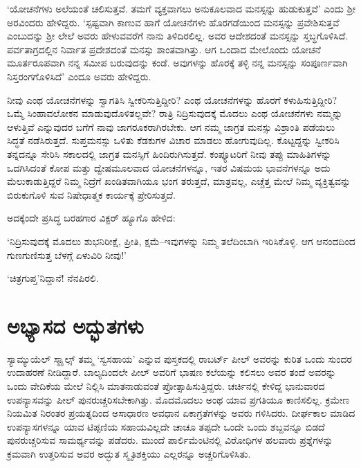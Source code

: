 ‘ಯೋಚನೆಗಳು ಅಲೆಯಂತೆ ಚಲಿಸುತ್ತವೆ. ತಮಗೆ ವ್ಯಕ್ತವಾಗಲು ಅನುಕೂಲವಾದ ಮನಸ್ಸನ್ನು ಹುಡುಕುತ್ತವೆ’ ಎಂದು ಶ‍್ರೀ ಅರವಿಂದರು ಹೇಳಿದ್ದರು. ‘ಸ್ಪಷ್ಟವಾಗಿ ಕಾಣುವ ಹಾಗೆ ಯೋಚನೆಗಳು ಹೊರಗಡೆಯಿಂದ ಮನಸ್ಸನ್ನು ಪ್ರವೇಶಿಸುತ್ತವೆ ಎಂಬುದನ್ನು ಶ‍್ರೀ ಲೇಲೆ ಅವರು ಹೇಳುವವರೆಗೆ ನಾನು ತಿಳಿದಿರಲಿಲ್ಲ. ಅವರ ಆದೇಶದಂತೆ ಮನಸ್ಸನ್ನು ಸ್ತಬ್ಧಗೊಳಿಸಿದೆ. ಪರ್ವತಾಗ್ರದಲ್ಲಿನ ನಿರ್ವಾತ ಪ್ರದೇಶದಂತೆ ಮನಸ್ಸು ಶಾಂತವಾಗಿತ್ತು. ಆಗ ಒಂದಾದ ಮೇಲೊಂದು ಯೋಚನೆ ಮೂರ್ತರೂಪವಾಗಿ ನನ್ನ ಸಮೀಪ ಬರುವುದನ್ನು ಕಂಡೆ. ಅವುಗಳನ್ನು ಹೊರಕ್ಕೆ ತಳ್ಳಿ ನನ್ನ ಮನಸ್ಸನ್ನು ಸಂಪೂರ್ಣವಾಗಿ ನಿಸ್ತರಂಗಗೊಳಿಸಿದೆ’ ಎಂದೂ ಅವರು ಹೇಳಿದ್ದರು.

ನೀವು ಎಂಥ ಯೋಚನೆಗಳನ್ನು ಸ್ವಾಗತಿಸಿ ಸ್ವೀಕರಿಸುತ್ತಿದ್ದೀರಿ? ಎಂಥ ಯೋಚನೆಗಳನ್ನು ಹೊರಗೆ ಕಳುಹಿಸುತ್ತಿದ್ದೀರಿ? ಒಮ್ಮೆ ಸಿಂಹಾವಲೋಕನ ಮಾಡುವುದೊಳಿತಲ್ಲವೇ? ರಾತ್ರಿ ನಿದ್ರಿಸುವುದಕ್ಕೆ ಮೊದಲು ಎಂಥ ಯೋಚನೆಗಳು ನಮ್ಮನ್ನು ಆಳುತ್ತಿವೆ ಎನ್ನುವುದರ ಬಗೆಗೆ ನಾವು ಜಾಗರೂಕರಾಗಿರಬೇಕು. ಆಗ ನಮ್ಮ ಜಾಗ್ರತ ಮನಸ್ಸು ವಿಶ್ರಾಂತಿ ಪಡೆಯಲು ಸಿದ್ಧತೆ ನಡೆಸಿರುತ್ತದೆ. ಸುಪ್ತಮನಸ್ಸು ಒಳಿತು ಕೆಡಕುಗಳ ವಿಚಾರ ಮಾಡಲು ಹೋಗುವುದಿಲ್ಲ. ಕೊಟ್ಟದ್ದನ್ನು ಸ್ವೀಕರಿಸಿ ತನ್ನದನ್ನೂ ಸೇರಿಸಿ ಸಕಾಲದಲ್ಲಿ ಜಾಗ್ರತ ಮನಸ್ಸಿಗೆ ಹಿಂದಿರುಗಿಸುತ್ತದೆ. ಕಂಪ್ಯೂಟರಿಗೆ ನೀವು ತಪ್ಪು ಮಾಹಿತಿಗಳನ್ನು ಒದಗಿಸಿದಂತೆ ಕೋಪ ಮತ್ತು ದ್ವೇಷಮೂಲವಾದ ಯೋಚನೆಗಳನ್ನೂ, ಇತರ ವಿಷಮಯ ಭಾವನೆಗಳನ್ನೂ ಅದು ಮೆಲುಕಾಡುತ್ತಿದ್ದರೆ ನಿಮ್ಮ ನಿದ್ರೆಗೆ ಖಂಡಿತವಾಗಿಯೂ ಭಂಗ ತರುತ್ತದೆ, ಮಾತ್ರವಲ್ಲ, ಎಚ್ಚೆತ್ತ ಮೇಲೆ ನಿಮ್ಮ ವ್ಯಕ್ತಿತ್ವವನ್ನು ಬಿರುಕುಗೊಳಿ ಸುವ ನಿಷೇಧಾತ್ಮಕ ಕಾರ್ಯಕ್ಕೆ ಪ್ರೇರಿಸುತ್ತದೆ.

ಅದಕ್ಕೆಂದೇ ಪ್ರಸಿದ್ಧ ಬರಹಗಾರ ವಿಕ್ಟರ್ ಹ್ಯೂಗೊ ಹೇಳಿದ:

‘ನಿದ್ರಿಸುವುದಕ್ಕೆ ಮೊದಲು ಶುಭನಿರೀಕ್ಷೆ, ಪ್ರೀತಿ, ಕ್ಷಮೆ–ಇವುಗಳನ್ನು ನಿಮ್ಮ ತಲೆದಿಂಬಾಗಿ ಇರಿಸಿಕೊಳ್ಳಿ. ಆಗ ಆನಂದದಿಂದ ಗುಣಗುಣಿಸುತ್ತ ಬೆಳಗ್ಗೆ ಏಳುವಿರಿ ನೀವು!’

‘ಚಿತ್ರಗುಪ್ತ’ನಿದ್ದಾನೆ! ನೆನಪಿರಲಿ.


\section*{ಅಭ್ಯಾಸದ ಅದ್ಭುತಗಳು}


ಸ್ಯಾಮ್ಯುಯೆಲ್ ಸ್ಮಾೖಲ್ಸ್ ತಮ್ಮ ‘ಸ್ವಸಹಾಯ’ ಎನ್ನುವ ಪುಸ್ತಕದಲ್ಲಿ ರಾಬರ್ಟ್ ಪೀಲ್ ಅವರನ್ನು ಕುರಿತ ಒಂದು ಸುಂದರ ಉದಾಹರಣೆ ನೀಡಿದ್ದಾರೆ. ಬಾಲ್ಯದಿಂದಲೇ ಪೀಲ್ ಅವರಿಗೆ ಭಾಷಣ ಕಲೆಯನ್ನು ಕಲಿಸಲು ಅವರ ತಂದೆ ಅವರನ್ನು ಒಂದು ವೇದಿಕೆಯ ಮೇಲೆ ನಿಲ್ಲಿಸಿ ಮಾತನಾಡುವಂತೆ ಪ್ರೋತ್ಸಾಹಿಸುತ್ತಿದ್ದರು. ಚರ್ಚಿನಲ್ಲಿ ಕೇಳಿದ್ದ ಭಾನುವಾರದ ಉಪನ್ಯಾಸವನ್ನು ಪೀಲ್ ಪುನರುಚ್ಚರಿಸಬೇಕಾಗಿತ್ತು. ಮೊದಮೊದಲು ಅಂಥ ಯಾವ ಪ್ರಗತಿಯೂ ಕಾಣಿಸಲಿಲ್ಲ. ಕ್ರಮೇಣ ನಿಯಮಿತ ನಿರಂತರ ಪ್ರಯತ್ನದಿಂದ ಅಸಾಧಾರಣ ಅವಧಾನ ಏಕಾಗ್ರತೆಗಳನ್ನು ಅವರು ಗಳಿಸಿದರು. ದೀರ್ಘಕಾಲ ಮಾಡಿದ ಉಪನ್ಯಾಸಗಳನ್ನೂ ಯಾವ ಟಿಪ್ಪಣಿಯ ಸಹಾಯವಿಲ್ಲದೇ ಚಾಚೂ ತಪ್ಪದೇ ಒಂದೇ ಒಂದು ಶಬ್ದವನ್ನೂ ಬಿಡದೆ ಪುನರುಚ್ಚರಿಸುವ ಸಾಮರ್ಥ್ಯವನ್ನು ಪಡೆದರು. ಮುಂದೆ ಪಾರ್ಲಿಮೆಂಟಿನಲ್ಲಿ ವಿರೋಧಿಗಳ ಹಲವಾರು ಪ್ರಶ್ನೆಗಳನ್ನು ಕ್ರಮವಾಗಿ ಉತ್ತರಿಸುವ ಅವರ ಅದ್ಭುತ ಸ್ಮೃತಿಶಕ್ತಿಯು ಎಲ್ಲರನ್ನೂ ಅಚ್ಚರಿಗೊಳಿಸಿತು.

